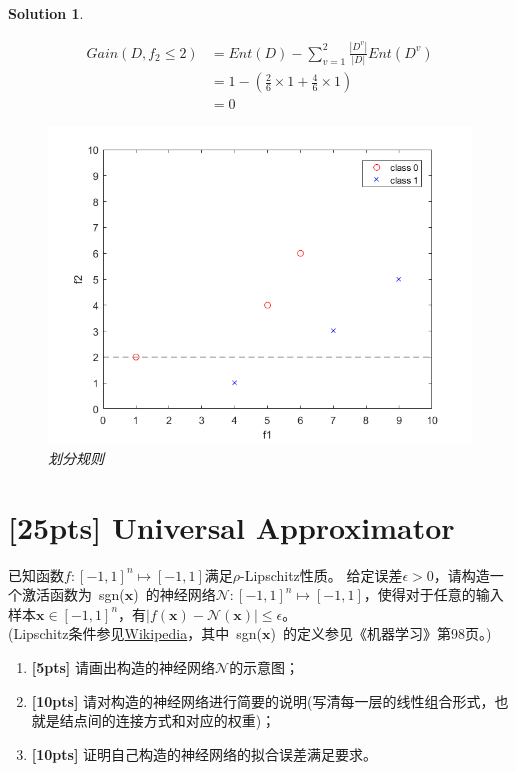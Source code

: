 \documentclass[a4paper,UTF8]{article}
\numberwithin{equation}{section}
\newtheorem*{solution}{Solution}
\begin{document}
\begin{solution}
\begin{enumerate}
\begin{equation}
 \begin{aligned}
 Gain(D, f_2\leq 2) &= Ent(D) - \sum_{v=1}^{2}\frac{|D^v|}{|D|}Ent(D^v)\\
 &= 1 - (\frac{2}{6}\times 1 + \frac{4}{6}\times 1)\\
 &= 0
 \end{aligned}
 \end{equation}
 \begin{figure}[!h]
 	\centering   
 	\includegraphics[scale=0.4]{coordinate2.png}  
 	\caption{划分规则} 
 	\label{coordinate2}
 \end{figure}
 \end{enumerate}
 \end{solution}
\newpage

\section{[25pts] Universal Approximator}
已知函数$f:[-1, 1]^n \mapsto [-1, 1]$满足$\rho$-Lipschitz性质。 给定误差$\epsilon > 0$，请构造一个激活函数为\mbox{ sgn($\mathbf{x}$) }的神经网络$ \mathcal{N}:[-1,1]^n \mapsto [-1,1] $，使得对于任意的输入样本$ \mathbf{x} \in [-1,1]^n $，有$|f(\mathbf{x}) - \mathcal{N}(\mathbf{x})| \leq \epsilon$。\\
(Lipschitz条件参见\href{https://en.wikipedia.org/wiki/Lipschitz_continuity}{Wikipedia}，其中\mbox{ sgn($\mathbf{x}$) }的定义参见《机器学习》第98页。)

\begin{enumerate}[ {(}1{)}]
	\item \textbf{[5pts]} 请画出构造的神经网络$\mathcal{N}$的示意图；
	
	\item \textbf{[10pts]} 请对构造的神经网络进行简要的说明(写清每一层的线性组合形式，也就是结点间的连接方式和对应的权重)；
	
	\item \textbf{[10pts]} 证明自己构造的神经网络的拟合误差满足要求。
\end{enumerate}
\end{document}
